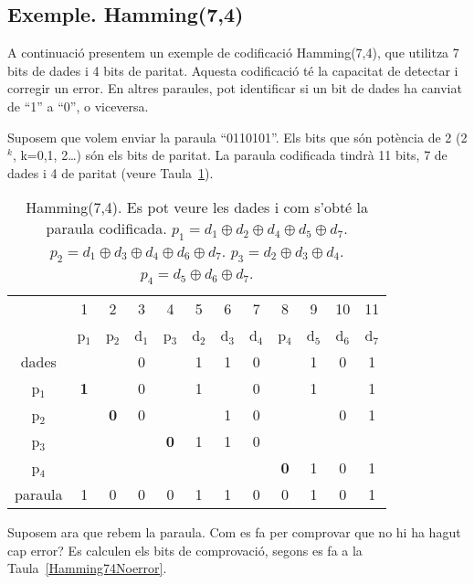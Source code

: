 \subsection{Exemple. Hamming(7,4)}

A continuació presentem un exemple de codificació Hamming(7,4), que utilitza 7 bits de dades i 4 bits de paritat. Aquesta codificació té la capacitat de detectar i corregir un error. En altres paraules, pot identificar si un bit de dades ha canviat de ``1'' a ``0'', o viceversa.

\begin{mdframed}[linewidth=2pt,linecolor=teal]
Suposem que volem enviar la paraula ``0110101''. Els bits que són potència de 2 (2$^k$, k=0,1, 2\ldots) són els bits de paritat. La paraula codificada tindrà 11 bits, 7 de dades i 4 de paritat  (veure Taula~\ref{table:hamming74}). 
\end{mdframed}


\begin{table}[!htb]
        \centering
        \begin{tabular}{|c|c|c|c|c|c|c|c|c|c|c|c|}\cline{2-12}
        
        \multicolumn{1}{c|}{}&1&2&3&4&5&6&7&8&9&10&11\\ \cline{2-12}
        \multicolumn{1}{c|}{}&p$_1$&p$_2$&d$_1$&p$_3$&d$_2$&d$_3$&d$_4$&p$_4$&d$_5$&d$_6$&d$_7$\\ \hline
        dades&&&0&&1&1&0&&1&0&1\\ \hline
        p$_1$&\textbf{1}&&0&&1&&0&&1&&1\\  \hline
        p$_2$&&\textbf{0}&0&&&1&0&&&0&1\\  \hline
        p$_3$&&&&\textbf{0}&1&1&0&&&&\\  \hline
        p$_4$&&&&&&&&\textbf{0}&1&0&1 \\  \hline
        paraula&1&0&0&0&1&1&0&0&1&0&1 \\  \hline
        \end{tabular}
        \caption{Hamming(7,4). Es pot veure les dades i com s'obté la paraula codificada. $p_1=d_1 \oplus d_2 \oplus d_4 \oplus d_5 \oplus d_7$. $p_2=d_1 \oplus d_3 \oplus d_4 \oplus d_6 \oplus d_7$. $p_3=d_2 \oplus d_3 \oplus d_4$. $p_4=d_5 \oplus d_6 \oplus d_7$.}
        \label{table:hamming74}
        \end{table}


\begin{mdframed}[linewidth=2pt,linecolor=teal]
Suposem ara que rebem la paraula. Com es fa per comprovar que no hi ha hagut cap error? Es calculen els bits de comprovació, segons es fa a la Taula~\ref{Hamming74Noerror}.
\end{mdframed}


